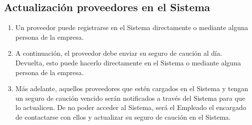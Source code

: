\subsection{Actualización proveedores en el Sistema}
\begin{enumerate}
    \item Un proveedor puede registrarse en el Sistema directamente o mediante alguna persona de la empresa.
    \item A continuación, el proveedor debe enviar su seguro de caución al día. Devuelta, esto puede hacerlo directamente en el Sistema o mediante alguna persona de la empresa.
    \item Más adelante, aquellos proveedores que estén cargados en el Sistema y tengan un seguro de caución vencido serán notificados a través del Sistema para que lo actualicen.
      De no poder acceder al Sistema, será el Empleado el encargado de contactarse con ellos y actualizar su seguro de caución en el Sistema.
\end{enumerate}
